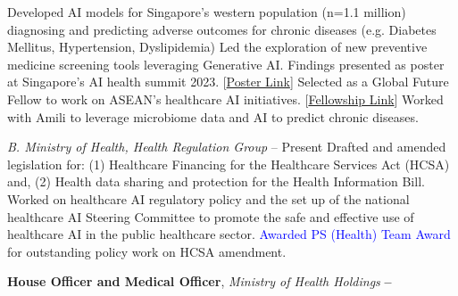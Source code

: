 \documentclass[letterpaper,10pt,oneside]{article}
\begin{document}
\begin{body}
\BulletItem
Developed AI models for Singapore's western population (n=1.1 million) diagnosing and predicting adverse outcomes for chronic diseases (e.g. Diabetes Mellitus, Hypertension, Dyslipidemia)
\BulletItem
Led the exploration of new preventive medicine screening tools leveraging Generative AI. Findings presented as  poster at Singapore's AI health summit 2023. [\href{https://docs.google.com/presentation/d/1E7zpdfZRCoBG4xJP8vMmErmKKfLCdLI5Spf-3fSMxbU/}{Poster Link}]  
\BulletItem
Selected as a Global Future Fellow to work on ASEAN's healthcare AI initiatives.  [\href{https://globalfuturex.org/2023healthfellows}{Fellowship Link}]
\BulletItem
Worked with Amili to leverage microbiome data and AI to predict chronic diseases.

\BigGap
\textit{B. Ministry of Health, Health Regulation Group}
\hfill
{} --
Present
\BulletItem
Drafted and amended legislation for: (1) Healthcare Financing for the Healthcare Services Act (HCSA) and, (2) Health data sharing and protection for the Health Information Bill.
\BulletItem
Worked on healthcare AI regulatory policy and the set up of the national healthcare AI Steering Committee to promote the safe and effective use of healthcare AI in the public healthcare sector.
\BulletItem
\textcolor{blue}{Awarded PS (Health) Team Award} for outstanding policy work on HCSA amendment. 


\BigGap
{\textbf{House Officer and Medical Officer}, \textit{Ministry of Health Holdings}}
\hfill
\textbf{
 --
}


\end{body}
\end{document}

